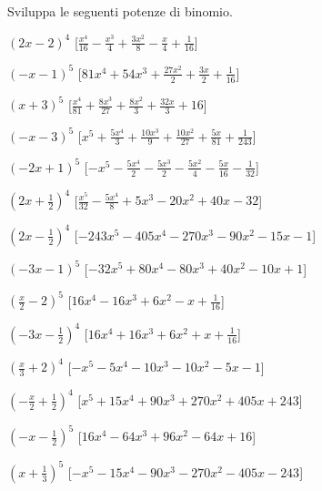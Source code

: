 \begin{esercizio}
 \label{ese:11.29}
 Sviluppa le seguenti potenze di binomio.
 \begin{enumeratea}
 \spazielenx
\item \(\left(2 x - 2\right)^{4}\)
  \hfill [\(\frac{x^{4}}{16} - \frac{x^{3}}{4} + \frac{3 x^{2}}{8} - 
\frac{x}{4} + \frac{1}{16}\)]
\item \(\left(- x - 1\right)^{5}\)
  \hfill [\(81 x^{4} + 54 x^{3} + \frac{27 x^{2}}{2} + \frac{3 x}{2} + 
\frac{1}{16}\)]
\item \(\left(x + 3\right)^{5}\)
  \hfill [\(\frac{x^{4}}{81} + \frac{8 x^{3}}{27} + \frac{8 x^{2}}{3} + 
\frac{32 x}{3} + 16\)]
\item \(\left(- x - 3\right)^{5}\)
  \hfill [\(x^{5} + \frac{5 x^{4}}{3} + \frac{10 x^{3}}{9} + \frac{10 
x^{2}}{27} + \frac{5 x}{81} + \frac{1}{243}\)]
\item \(\left(- 2 x + 1\right)^{5}\)
  \hfill [\(- x^{5} - \frac{5 x^{4}}{2} - \frac{5 x^{3}}{2} - \frac{5 
x^{2}}{4} - \frac{5 x}{16} - \frac{1}{32}\)]
\item \(\left(2 x + \frac{1}{2}\right)^{4}\)
  \hfill [\(\frac{x^{5}}{32} - \frac{5 x^{4}}{8} + 5 x^{3} - 20 x^{2} + 40 
x - 32\)]
\item \(\left(2 x - \frac{1}{2}\right)^{4}\)
  \hfill [\(- 243 x^{5} - 405 x^{4} - 270 x^{3} - 90 x^{2} - 15 x - 1\)]
\item \(\left(- 3 x - 1\right)^{5}\)
  \hfill [\(- 32 x^{5} + 80 x^{4} - 80 x^{3} + 40 x^{2} - 10 x + 1\)]
\item \(\left(\frac{x}{2} - 2\right)^{5}\)
  \hfill [\(16 x^{4} - 16 x^{3} + 6 x^{2} - x + \frac{1}{16}\)]
\item \(\left(- 3 x - \frac{1}{2}\right)^{4}\)
  \hfill [\(16 x^{4} + 16 x^{3} + 6 x^{2} + x + \frac{1}{16}\)]
\item \(\left(\frac{x}{3} + 2\right)^{4}\)
  \hfill [\(- x^{5} - 5 x^{4} - 10 x^{3} - 10 x^{2} - 5 x - 1\)]
\item \(\left(- \frac{x}{2} + \frac{1}{2}\right)^{4}\)
  \hfill [\(x^{5} + 15 x^{4} + 90 x^{3} + 270 x^{2} + 405 x + 243\)]
\item \(\left(- x - \frac{1}{2}\right)^{5}\)
  \hfill [\(16 x^{4} - 64 x^{3} + 96 x^{2} - 64 x + 16\)]
\item \(\left(x + \frac{1}{3}\right)^{5}\)
  \hfill [\(- x^{5} - 15 x^{4} - 90 x^{3} - 270 x^{2} - 405 x - 243\)]

\end{enumeratea}
\end{esercizio}
